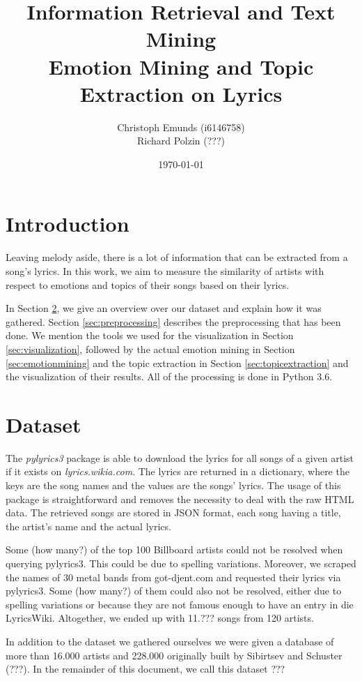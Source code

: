 \documentclass[10pt,a4paper]{article}
\author{Christoph Emunds (i6146758)\\Richard Polzin (???)}
\title{Information Retrieval and Text Mining\\Emotion Mining and Topic Extraction on Lyrics}
\date{\today}
\begin{document}
	\maketitle
	
	\tableofcontents
	
	\section{Introduction}
	\label{sec:introduction}
	Leaving melody aside, there is a lot of information that can be extracted from a song's lyrics. In this work, we aim to measure the similarity of artists with respect to emotions and topics of their songs based on their lyrics.
	
	In Section \ref{sec:dataset}, we give an overview over our dataset and explain how it was gathered. Section \ref{sec:preprocessing} describes the preprocessing that has been done. We mention the tools we used for the visualization in Section \ref{sec:visualization}, followed by the actual emotion mining in Section \ref{sec:emotionmining} and the topic extraction in Section \ref{sec:topicextraction} and the visualization of their results. All of the processing is done in Python 3.6.

	\section{Dataset}
	\label{sec:dataset}
	The \textit{pylyrics3} package is able to download the lyrics for all songs of a given artist if it exists on \textit{lyrics.wikia.com}. The lyrics are returned in a dictionary, where the keys are the song names and the values are the songs' lyrics. The usage of this package is straightforward and removes the necessity to deal with the raw HTML data. The retrieved songs are stored in JSON format, each song having a title, the artist's name and the actual lyrics.
	
	Some (how many?) of the top 100 Billboard artists could not be resolved when querying pylyrics3. This could be due to spelling variations. Moreover, we scraped the names of 30 metal bands from got-djent.com and requested their lyrics via pylyrics3. Some (how many?) of them could also not be resolved, either due to spelling variations or because they are not famous enough to have an entry in die LyricsWiki. Altogether, we ended up with 11.??? songs from 120 artists.

	In addition to the dataset we gathered ourselves we were given a database of more than 16.000 artists and 228.000 originally built by Sibirtsev and Schuster (???). In the remainder of this document, we call this dataset ???
	
\end{document}
